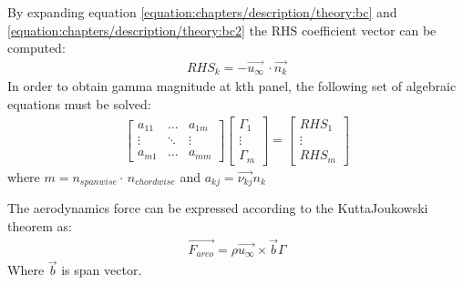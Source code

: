 \documentclass[letterpaper,10pt,english]{jupyterBook}
\begin{document}
\sphinxAtStartPar
By expanding equation \eqref{equation:chapters/description/theory:bc} and \eqref{equation:chapters/description/theory:bc2} the RHS coefficient vector can be computed:
\begin{equation*}
\begin{split}
RHS_k=-\overrightarrow{u_{\infty}}\,\cdot\overrightarrow{n_k}
\end{split}
\end{equation*}
\sphinxAtStartPar
In order to obtain gamma magnitude at k\sphinxhyphen{}th panel, the following set of algebraic equations must be solved:
\label{equation:chapters/description/theory:d7f36001-31f4-4697-b729-f9b52cc6ff99}\begin{gather}
    \begin{bmatrix} 
    a_{11} & \dots  & a_{1m}\\
    \vdots & \ddots & \vdots\\
    a_{m1} & \dots  & a_{mm}
    \end{bmatrix}
\begin{bmatrix} 
    \Gamma_{1} \\
    \vdots \\
    \Gamma_{m}
    \end{bmatrix}
 =
  \begin{bmatrix} 
    RHS_{1} \\
    \vdots \\
    RHS_{m}
    \end{bmatrix}
\end{gather}
\sphinxAtStartPar
where \(m=n_{spanwise}\cdot\,n_{chordwise}\) and \(a_{kj} = \overrightarrow{\nu_{kj}} n_k\)

\sphinxAtStartPar
The aerodynamics force can be expressed according to the Kutta\sphinxhyphen{}Joukowski theorem as:
\begin{equation*}
\begin{split}
\overrightarrow{F_{areo}} = \rho \overrightarrow{u_{\infty}} \times \overrightarrow{b} \Gamma
\end{split}
\end{equation*}
\sphinxAtStartPar
Where \(\overrightarrow{b}\) is span vector.
\end{document}
